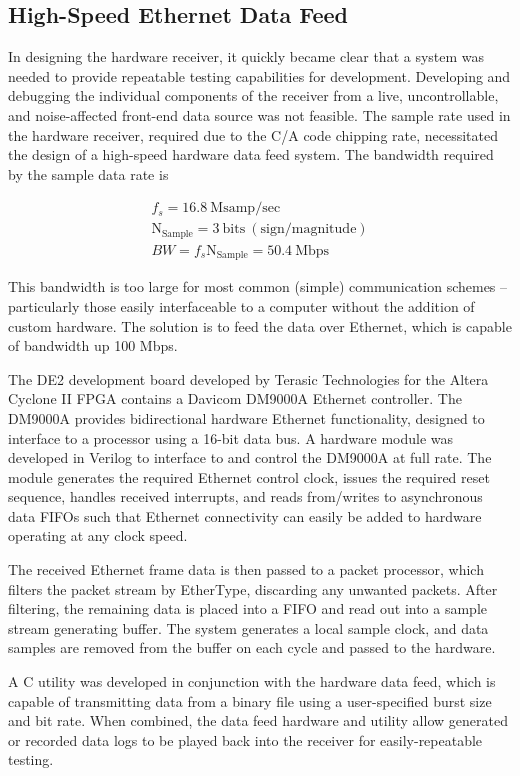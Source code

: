 \documentclass[12pt]{article}
\begin{document}
\subsection{High-Speed Ethernet Data Feed}
In designing the hardware receiver, it quickly became clear that a system was needed to provide repeatable testing capabilities for development. Developing and debugging the individual components of the receiver from a live, uncontrollable, and noise-affected front-end data source was not feasible. The sample rate used in the hardware receiver, required due to the C/A code chipping rate, necessitated the design of a high-speed hardware data feed system. The bandwidth required by the sample data rate is

\begin{gather*}
f_s = 16.8\ \mathrm{Msamp/sec} \\
\mathrm{N_{Sample}} = 3\ \mathrm{bits\ (sign/magnitude)} \\
BW = f_s \mathrm{N_{Sample}} = 50.4\ \mathrm{Mbps}
\end{gather*}

This bandwidth is too large for most common (simple) communication schemes -- particularly those easily interfaceable to a computer without the addition of custom hardware. The solution is to feed the data over Ethernet, which is capable of bandwidth up 100 Mbps.

The DE2 development board developed by Terasic Technologies for the Altera Cyclone II FPGA contains a Davicom DM9000A Ethernet controller. The DM9000A provides bidirectional hardware Ethernet functionality, designed to interface to a processor using a 16-bit data bus. \cite{davicom} A hardware module was developed in Verilog to interface to and control the DM9000A at full rate. The module generates the required Ethernet control clock, issues the required reset sequence, handles received interrupts, and reads from/writes to asynchronous data FIFOs such that Ethernet connectivity can easily be added to hardware operating at any clock speed.

The received Ethernet frame data is then passed to a packet processor, which filters the packet stream by EtherType, discarding any unwanted packets. After filtering, the remaining data is placed into a FIFO and read out into a sample stream generating buffer. The system generates a local sample clock, and data samples are removed from the buffer on each cycle and passed to the hardware.

A C utility was developed in conjunction with the hardware data feed, which is capable of transmitting data from a binary file using a user-specified burst size and bit rate. When combined, the data feed hardware and utility allow generated or recorded data logs to be played back into the receiver for easily-repeatable testing.
\end{document}
